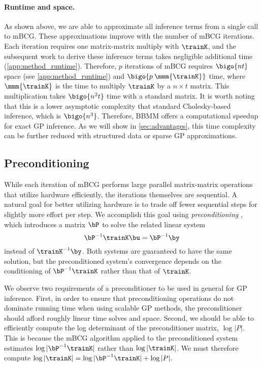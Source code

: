\paragraph{Runtime and space.}
As shown above, we are able to approximate all inference terms from a single call to mBCG.
These approximations improve with the number of mBCG iterations.
Each iteration requires one matrix-matrix multiply with $\trainK$, and the subsequent work to derive these inference terms takes negligible additional time (\cref{app:method_runtime}).
Therefore, $p$ iterations of mBCG requires $\bigo{nt}$ space (see \cref{app:method_runtime}) and $\bigo{p \: \mmm{\trainK}}$ time,
where $\mmm{\trainK}$ is the time to multiply $\trainK$ by a $n \times t$ matrix.
This multiplication takes $\bigo{n^2 t}$ time with a standard matrix.
It is worth noting that this is a lower asymptotic complexity that standard Cholesky-based inference, which is $\bigo{n^3}$.
Therefore, BBMM offers a computational speedup for exact GP inference.
As we will show in \cref{sec:advantages}, this time complexity can be further reduced with structured data or sparse GP approximations.
%
\subsection{Preconditioning}
\label{sec:preconditioning}
While each iteration of mBCG performs large parallel matrix-matrix operations that utilize hardware efficiently, the iterations themselves are sequential.
A natural goal for better utilizing hardware is to trade off fewer sequential steps for slightly more effort per step.
We accomplish this goal using \emph{preconditioning} \cite{golub2012matrix,saad2003iterative,demmel1997applied,van2003iterative}, which introduces a matrix $\bP$ to solve the related linear system
\begin{equation*}
  \bP^{-1} \trainK \bu = \bP^{-1}\by
\end{equation*}
instead of $\trainK^{-1} \by$.
Both systems are guaranteed to have the same solution, but the preconditioned system's convergence depends on the conditioning of $\bP^{-1}\trainK$ rather than that of $\trainK$.

We observe two requirements of a preconditioner to be used in general for GP inference. First, in order to ensure that preconditioning operations do not dominate running time when using scalable GP methods, the preconditioner should afford roughly linear time solves and space. Second, we should be able to efficiently compute the log determinant of the preconditioner matrix, $\log \vert P \vert$. This is because the mBCG algorithm applied to the preconditioned system estimates $\log \vert \bP^{-1}\trainK \vert$ rather than $\log \vert \trainK \vert$. We must therefore compute
$
  \label{eq:logdet_adjusted}
  \log \vert \trainK \vert = \log \vert \bP^{-1}\trainK \vert + \log \vert P \vert.
$

